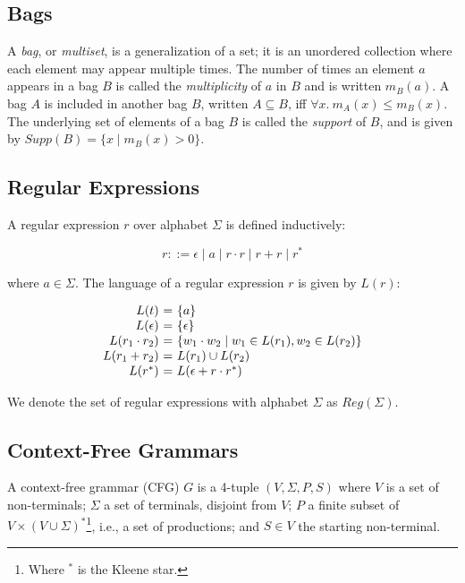 \documentclass[acmsmall,review,anonymous]{acmart}\settopmatter{printfolios=true,printccs=false,printacmref=false}
\newcommand{\support}{\mathit{Supp}}
\newcommand{\NT}{V} %
\newcommand{\T}{\Sigma} %
\newcommand{\regex}{\mathit{Reg}}
\begin{document}
\subsection{Bags} \label{sec:bags}

A \emph{bag}, or \emph{multiset}, is a generalization of a set; it is an unordered collection where each element may appear multiple times. The number of times an element $a$ appears in a bag $B$ is called the \emph{multiplicity} of $a$ in $B$ and is written $m_B(a)$. A bag $A$ is included in another bag $B$, written $A \subseteq B$, iff $\forall x.\ m_A(x) \leq m_B(x)$. The underlying set of elements of a bag $B$ is called the \emph{support} of $B$, and is given by $\support(B) = \{ x \mid m_B(x) > 0 \}$.

\subsection{Regular Expressions} \label{sec:preliminaries-regexes}

A regular expression $r$ over alphabet $\T$ is defined inductively:

$$r ::= \epsilon \mid a \mid r \cdot r \mid r + r \mid r^{*}$$

\noindent where $a \in \T$. The language of a regular expression $r$ is given by $L(r)$:

$$
\begin{array}{r@{\ =\ }l}
  L(t) & \{a\} \\
  L(\epsilon) & \{\epsilon\} \\
  L(r_1 \cdot r_2) & \{ w_1 \cdot w_2 \mid w_1 \in L(r_1), w_2 \in L(r_2) \} \\
  L(r_1 + r_2) & L(r_1) \cup L(r_2) \\
  L(r^{*}) & L(\epsilon + r \cdot r^{*}) \\
\end{array}
$$

\noindent We denote the set of regular expressions with alphabet $\T$ as $\regex(\T)$.

\subsection{Context-Free Grammars} \label{sec:preliminaries-cfgs}

A context-free grammar (CFG) $G$ is a 4-tuple $(\NT, \T, P, S)$ where $\NT$ is a set of non-terminals; $\T$ a set of terminals, disjoint from $\NT$; $P$ a finite subset of $\NT \times (\NT \cup \T)^{*}$\footnote{Where $^{*}$ is the Kleene star.}, i.e., a set of productions; and $S \in \NT$ the starting non-terminal.
\end{document}
